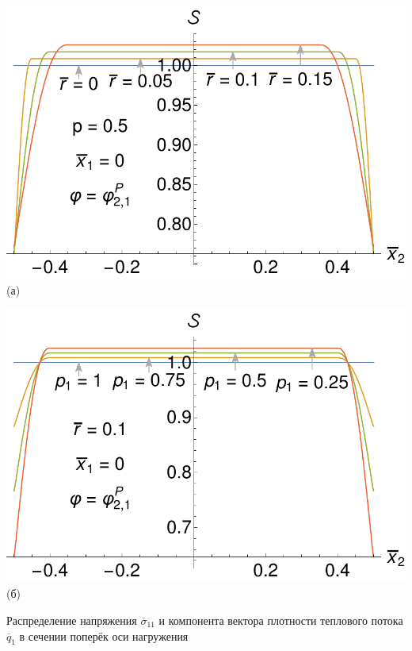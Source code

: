 \begin{frame}
	\begin{minipage}{0.4\textwidth}
		\centering
		\includegraphics[width=\textwidth]{pics/HeatFluxStabilityVariationRPresentation.pdf} \\
		(а)
	\end{minipage}
	\begin{minipage}{0.4\textwidth}
		\centering
		\includegraphics[width=\textwidth]{pics/HeatFluxStabilityVariationP1Presentation.pdf} \\
		(б)
	\end{minipage}
	
	Распределение напряжения $\overline{\sigma}_{11}$ и компонента вектора плотности теплового потока $\overline{q}_1$ в сечении поперёк оси нагружения
\end{frame}

